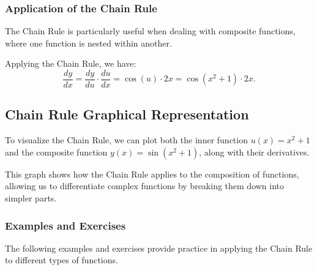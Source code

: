 \documentclass[a4paper,12pt]{book}
\newcounter{example}
\begin{document}
\subsubsection*{Application of the Chain Rule}
The Chain Rule is particularly useful when dealing with composite functions, where one function is nested within another.


Applying the Chain Rule, we have:
\[ \frac{dy}{dx} = \frac{dy}{du} \cdot \frac{du}{dx} = \cos(u) \cdot 2x = \cos(x^2 + 1) \cdot 2x. \]

\subsection{Chain Rule Graphical Representation}
To visualize the Chain Rule, we can plot both the inner function \( u(x) = x^2 + 1 \) and the composite function \( y(x) = \sin(x^2 + 1) \), along with their derivatives.

\begin{center}
\end{center}

This graph shows how the Chain Rule applies to the composition of functions, allowing us to differentiate complex functions by breaking them down into simpler parts.

\subsubsection*{Examples and Exercises}
The following examples and exercises provide practice in applying the Chain Rule to different types of functions.
\end{document}
